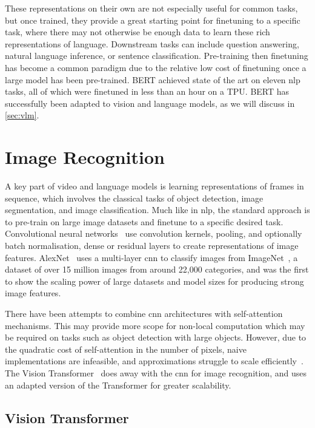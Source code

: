 These representations on their own are not especially useful for common tasks,
but once trained, they provide a great starting point for finetuning to a
specific task, where there may not otherwise be enough data to learn these rich
representations of language. Downstream tasks can include question answering,
natural language inference, or sentence classification. Pre-training then
finetuning has become a common paradigm due to the relative low cost of
finetuning once a large model has been pre-trained. BERT achieved state of the
art on eleven \acrshort{nlp} tasks, all of which were finetuned in less than an
hour on a TPU. BERT has successfully been adapted to vision and language
models, as we will discuss in \cref{sec:vlm}.


\section{Image Recognition}
\label{sec:imrec}

A key part of video and language models is learning representations of frames
in sequence, which involves the classical tasks of object detection, image
segmentation, and image classification. Much like in \acrshort{nlp}, the
standard approach is to pre-train on large image datasets and finetune to a
specific desired task. Convolutional neural
networks~\citep{lecun1989lenet,krizhevsky2012alexnet,he2016resnet} use
convolution kernels, pooling, and optionally batch normalisation, dense or
residual layers to create representations of image features.
AlexNet~\citep{krizhevsky2012alexnet} uses a multi-layer \acrfull{cnn} to
classify images from ImageNet~\citep{deng2009imagenet}, a dataset of over 15
million images from around 22,000 categories, and was the first to show the
scaling power of large datasets and model sizes for producing strong image
features. 

There have been attempts to combine \acrshort{cnn} architectures with
self-attention mechanisms. This may provide more scope for non-local
computation which may be required on tasks such as object detection with large
objects. However, due to the quadratic cost of self-attention in the number of
pixels, naive implementations are infeasible, and approximations struggle to
scale efficiently~\citep{carion2020detr}. The Vision
Transformer~\citep{dosovitskiy2021vit} does away with the \acrshort{cnn} for
image recognition, and uses an adapted version of the Transformer for greater
scalability.


\subsection{Vision Transformer}
\label{ssec:vit}

